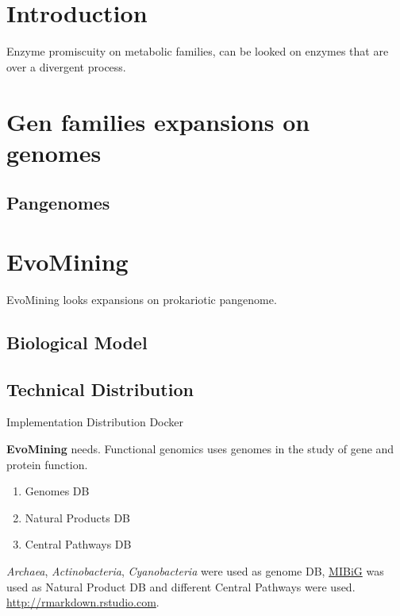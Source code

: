 \documentclass[12pt,twoside]{reedthesis}
\providecommand{\tightlist}{%
  \setlength{\itemsep}{0pt}\setlength{\parskip}{0pt}}
\begin{document}
  \section{Introduction}\label{introduction-1}
  
  Enzyme promiscuity on metabolic families, can be looked on enzymes that
  are over a divergent process.
  
  \section{Gen families expansions on
  genomes}\label{gen-families-expansions-on-genomes}
  
  \subsection{Pangenomes}\label{pangenomes}
  
  \section{EvoMining}\label{evomining}
  
  EvoMining looks expansions on prokariotic pangenome.
  
  \subsection{Biological Model}\label{biological-model}
  
  \subsection{Technical Distribution}\label{technical-distribution}
  
  Implementation Distribution Docker
  
  \textbf{EvoMining} needs. Functional genomics uses genomes in the study
  of gene and protein function\protect\hyperlink{section}{}.
  
  \begin{enumerate}
  \def\labelenumi{\arabic{enumi}.}
  \tightlist
  \item
    Genomes DB
  \item
    Natural Products DB
  \item
    Central Pathways DB
  \end{enumerate}
  
  \emph{Archaea}, \emph{Actinobacteria}, \emph{Cyanobacteria} were used as
  genome DB, \href{http://mibig.secondarymetabolites.org/}{MIBiG} was used
  as Natural Product DB and different Central Pathways were used.
  \url{http://rmarkdown.rstudio.com}.
  
\end{document}
